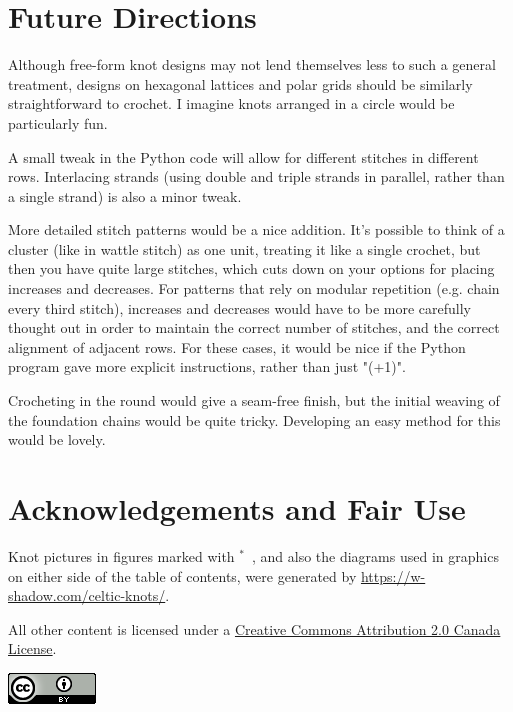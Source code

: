 \documentclass[openany]{book}
\newcommand{\gen}{\hyperref[generated]{$^*$}}%
\begin{document}
 \chapter{Future Directions}
Although free-form knot designs may not lend themselves less to such a general treatment, designs on hexagonal lattices and polar grids should be similarly straightforward to crochet. I imagine knots arranged in a circle would be particularly fun.

A small tweak in the Python code will allow for different stitches in different rows. Interlacing strands (using double and triple strands in parallel, rather than a single strand) is also a minor tweak.
 
More detailed stitch patterns would be a nice addition. It's possible to think of a cluster (like in wattle stitch) as one unit, treating it like a single crochet, but then you have quite large stitches, which cuts down on your options for placing increases and decreases. For patterns that rely on modular repetition (e.g. chain every third stitch), increases and decreases would have to be more carefully thought out in order to maintain the correct number of stitches, and the correct alignment of adjacent rows. For these cases, it would be nice if the Python program gave more explicit instructions, rather than just "(+1)".

Crocheting in the round would give a seam-free finish, but the initial weaving of the foundation chains would be quite tricky. Developing an easy method for this would be lovely.
 
\chapter{Acknowledgements and Fair Use}\label{generated}
Knot pictures in figures marked with \gen ~, and also the diagrams used in graphics on either side of the table of contents, %
were generated by \url{https://w-shadow.com/celtic-knots/}.  \medskip

\noindent All other content is licensed under a   \href{https://creativecommons.org/licenses/by/2.0/ca/}{Creative Commons Attribution 2.0 Canada License}.
\begin{center}
 \includegraphics{CCBY} 
 \end{center}
\medskip
\end{document}
